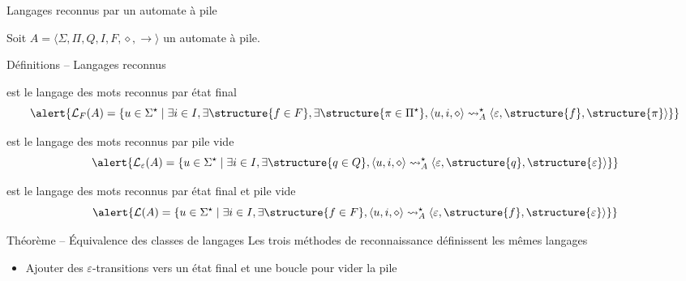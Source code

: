 
\begingroup

\begin{frame}{Langages reconnus par un automate à pile}
  
  Soit $A=\langle \Sigma, \Pi, Q, I, F, \diamond, \rightarrow \rangle$ un automate à pile.

  \begin{block}{Définitions -- Langages reconnus}
    \begin{description}[xxxxxx]
    \item[$\mathcal{L}_F(A)$] est le langage des mots reconnus \alert{par état final}
      $$\alert{\mathcal{L}_F(A) = \{u \in \Sigma^\star \mid
      \exists i\in I, \exists \structure{f\in F}, \exists \structure{\pi\in\Pi^\star}, \langle u, i, \diamond \rangle \leadsto_A^\star \langle \varepsilon, \structure{f}, \structure{\pi} \rangle\}}$$
    \item[$\mathcal{L}_\varepsilon(A)$] est le langage des mots reconnus \alert{par pile vide}
      $$\alert{\mathcal{L}_\varepsilon(A) = \{u \in \Sigma^\star \mid
      \exists i\in I, \exists \structure{q\in Q}, \langle u, i, \diamond \rangle \leadsto_A^\star \langle \varepsilon, \structure{q}, \structure{\varepsilon} \rangle\}}$$
    \item[$\mathcal{L}(A)$] est le langage des mots reconnus \alert{par état final et pile vide}
      $$\alert{\mathcal{L}(A) = \{u \in \Sigma^\star \mid
      \exists i\in I, \exists \structure{f\in F}, \langle u, i, \diamond \rangle \leadsto_A^\star \langle \varepsilon, \structure{f}, \structure{\varepsilon} \rangle\}}$$
    \end{description}
  \end{block}

  \begin{block}{Théorème -- Équivalence des classes de langages}
    Les trois méthodes de reconnaissance définissent les mêmes langages
    \begin{itemize}
    \item Ajouter des $\varepsilon$-transitions vers un état final et une boucle pour vider la pile
    \end{itemize}
  \end{block}

\end{frame}

\endgroup
